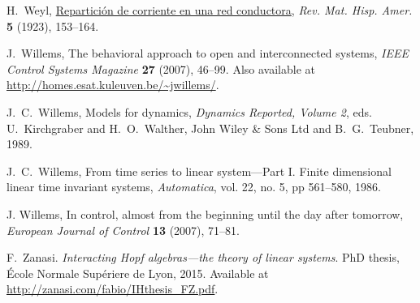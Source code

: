 \begin{thebibliography}{RSW00}
     H.\ Weyl,
    \href{http://math.ucr.edu/home/baez/weyl1923.pdf}{Repartici\'on de corriente
    en una red conductora}, {\sl Rev. Mat. Hisp. Amer.} {\bf 5} (1923), 153--164. 

     J.\ Willems, The behavioral approach to open and interconnected
    systems, {\sl IEEE Control Systems Magazine} {\bf 27} (2007), 46--99. Also
    available at
    \href{http://homes.esat.kuleuven.be/~jwillems/}  
    {http://homes.esat.kuleuven.be/\~{}jwillems/}.

     J.\ C.\ Willems, Models for dynamics, \emph{Dynamics Reported,
    Volume 2}, eds. U.\ Kirchgraber and H.\ O.\ Walther, John Wiley \& Sons
    Ltd and B.\ G.\ Teubner, 1989.

     J.\ C.\ Willems, From time series to linear system---Part I.
    Finite dimensional linear time invariant systems, \emph{Automatica}, vol.
    22, no. 5, pp 561--580, 1986. 

     J. Willems, In control, almost from the beginning until the day
    after tomorrow, {\sl European Journal of Control} {\bf 13} (2007), 71--81. 

     F.\ Zanasi. 
    \newblock \emph{Interacting Hopf algebras---the theory of linear
    systems}. 
    \newblock PhD thesis, \'Ecole Normale Sup\'eriere de Lyon, 2015. 
    \newblock Available
    at \href{http://zanasi.com/fabio/IHthesis_FZ.pdf}
    {http://zanasi.com/fabio/IHthesis\_FZ.pdf}.

\end{thebibliography}


